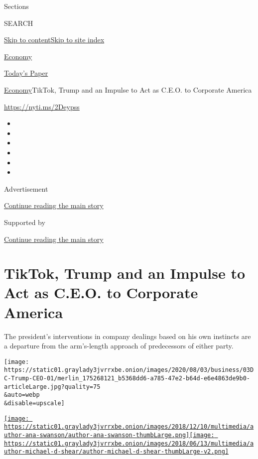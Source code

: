 Sections

SEARCH

\protect\hyperlink{site-content}{Skip to
content}\protect\hyperlink{site-index}{Skip to site index}

\href{https://www.nytimes3xbfgragh.onion/section/business/economy}{Economy}

\href{https://myaccount.nytimes3xbfgragh.onion/auth/login?response_type=cookie\&client_id=vi}{}

\href{https://www.nytimes3xbfgragh.onion/section/todayspaper}{Today's
Paper}

\href{/section/business/economy}{Economy}\textbar{}TikTok, Trump and an
Impulse to Act as C.E.O. to Corporate America

\href{https://nyti.ms/2Deypss}{https://nyti.ms/2Deypss}

\begin{itemize}
\item
\item
\item
\item
\item
\item
\end{itemize}

Advertisement

\protect\hyperlink{after-top}{Continue reading the main story}

Supported by

\protect\hyperlink{after-sponsor}{Continue reading the main story}

\hypertarget{tiktok-trump-and-an-impulse-to-act-as-ceo-to-corporate-america}{%
\section{TikTok, Trump and an Impulse to Act as C.E.O. to Corporate
America}\label{tiktok-trump-and-an-impulse-to-act-as-ceo-to-corporate-america}}

The president's interventions in company dealings based on his own
instincts are a departure from the arm's-length approach of predecessors
of either party.

\texttt{[image: https://static01.graylady3jvrrxbe.onion/images/2020/08/03/business/03DC-Trump-CEO-01/merlin\_175268121\_b5368dd6-a785-47e2-b64d-e6e4863de9b0-articleLarge.jpg?quality=75\\\&auto=webp\\\&disable=upscale]}

\href{https://www.nytimes3xbfgragh.onion/by/ana-swanson}{\texttt{[image: https://static01.graylady3jvrrxbe.onion/images/2018/12/10/multimedia/author-ana-swanson/author-ana-swanson-thumbLarge.png]}}\href{https://www.nytimes3xbfgragh.onion/by/michael-d-shear}{\texttt{[image: https://static01.graylady3jvrrxbe.onion/images/2018/06/13/multimedia/author-michael-d-shear/author-michael-d-shear-thumbLarge-v2.png]}}

